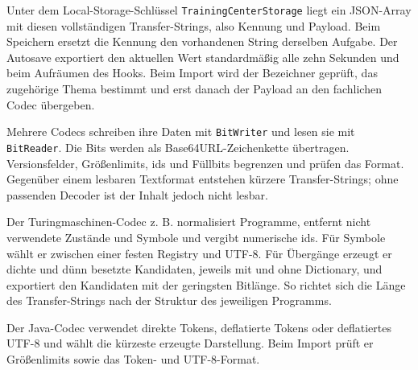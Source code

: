 Unter dem Local-Storage-Schlüssel \verb|TrainingCenterStorage| liegt ein JSON-Array mit diesen vollständigen Transfer-Strings, also Kennung und Payload. Beim Speichern ersetzt die Kennung den vorhandenen String derselben Aufgabe. Der Autosave exportiert den aktuellen Wert standardmäßig alle zehn Sekunden und beim Aufräumen des Hooks. Beim Import wird der Bezeichner geprüft, das zugehörige Thema bestimmt und erst danach der Payload an den fachlichen Codec übergeben.

Mehrere Codecs schreiben ihre Daten mit \verb|BitWriter| und lesen sie mit \verb|BitReader|. Die Bits werden als Base64URL-Zeichenkette übertragen. Versionsfelder, Größenlimits, \glspl{id} und Füllbits begrenzen und prüfen das Format. Gegenüber einem lesbaren Textformat entstehen kürzere Transfer-Strings; ohne passenden Decoder ist der Inhalt jedoch nicht lesbar.

Der Turingmaschinen-Codec z. B. normalisiert Programme, entfernt nicht verwendete Zustände und Symbole und vergibt numerische \glspl{id}. Für Symbole wählt er zwischen einer festen Registry und UTF-8. Für Übergänge erzeugt er dichte und dünn besetzte Kandidaten, jeweils mit und ohne Dictionary, und exportiert den Kandidaten mit der geringsten Bitlänge. So richtet sich die Länge des Transfer-Strings nach der Struktur des jeweiligen Programms.

Der Java-Codec verwendet direkte Tokens, deflatierte Tokens oder deflatiertes UTF-8 und wählt die kürzeste erzeugte Darstellung. Beim Import prüft er Größenlimits sowie das Token- und UTF-8-Format.
